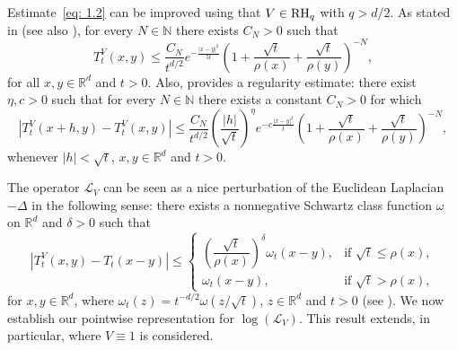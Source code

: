 \documentclass[10pt, a4paper, reqno]{amsart}
\theoremstyle{definition}
\theoremstyle{remark}
\newcommand{\RH}{\textup{RH}}
\numberwithin{equation}{section}
\begin{document}
Estimate~\eqref{eq: 1.2} can be improved using that $V \in \RH_q$ with $q > d/2$. As stated in \cite[Proposition~2]{DGMTZ} (see also \cite{DzZ2, Kur}), for every $N \in \mathbb{N}$ there exists $C_N> 0$ such that 
\begin{equation}\label{eq: 1.3}
    T_t^V(x,y) \leq \frac{C_N}{t^{d/2}} e^{-\frac{|x-y|^2}{5t}} \left( 1 + \frac{\sqrt{t}}{\rho(x)} + \frac{\sqrt{t}}{\rho(y)}\right)^{-N}, 
\end{equation}
for all $x, y \in \mathbb{R}^d$ and $t > 0$. Also,  \cite[Proposition~4.11]{DzZ2} provides a regularity estimate: there exist $\eta, c > 0$ such that for every $N \in \mathbb{N}$ there exists a constant $C_N > 0$ for which
\begin{equation}\label{eq: 1.4}
    |T_t^V(x+h,y) - T_t^V(x,y)| \leq \frac{C_N}{t^{d/2}} \left(\frac{|h|}{\sqrt{t}} \right)^{\eta} e^{-c\frac{|x-y|^2}{t}} \left( 1 + \frac{\sqrt{t}}{\rho(x)} + \frac{\sqrt{t}}{\rho(y)}\right)^{-N}, 
\end{equation}
whenever $|h| < \sqrt{t}$, $x, y \in \mathbb{R}^d$ and $t > 0$.

The operator $\mathcal{L}_V$ can be seen as a nice perturbation of the Euclidean Laplacian $-\Delta$ in the following sense: there exists a nonnegative Schwartz class function $\omega$ on $\mathbb{R}^d$ and $\delta > 0$ such that 
\begin{equation}\label{eq: 1.5}
    |T_t^V(x,y) - T_t(x-y)| \leq \begin{cases}
\left(\dfrac{\sqrt{t}}{\rho(x)}\right)^\delta \omega_t(x-y), & \text{if } \sqrt{t} \leq \rho(x),  \\
\omega_t(x-y), & \text{if } \sqrt{t} > \rho(x),
\end{cases}
\end{equation}
for $x, y \in \mathbb{R}^d$, where $\omega_t(z) = t^{-d/2} \omega(z/\sqrt{t})$, $z \in \mathbb{R}^d$ and $t > 0$ (see \cite[Proposition~2.16]{DzZ3}).
We now establish our pointwise representation for $\log(\mathcal{L}_V)$. This result extends, in particular, \cite[Theorem~1.1]{Feu1} where $V \equiv 1$ is considered. 
\end{document}
